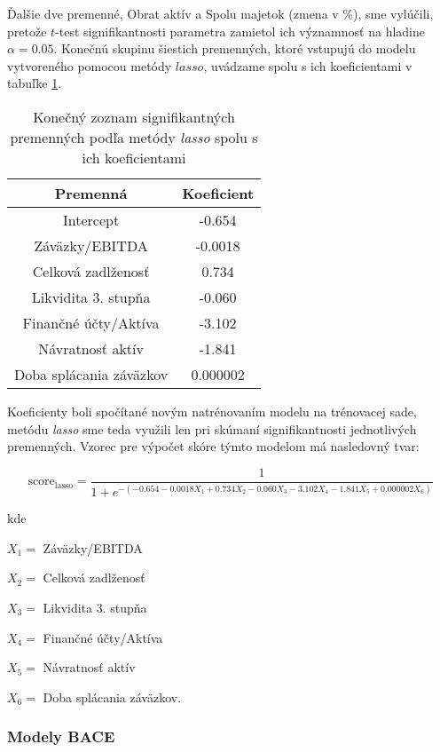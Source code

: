 Ďalšie dve premenné, Obrat aktív a Spolu majetok (zmena v \%), sme vylúčili, pretože \(t\)-test signifikantnosti parametra zamietol ich významnosť na hladine \(\alpha = 0.05\).
Konečnú skupinu šiestich premenných, ktoré vstupujú do modelu vytvoreného pomocou metódy \(lasso\), uvádzame spolu s ich koeficientami v tabuľke \ref{lasso tabulka konecne parametre}.

\begin{table}
    \begin{tabular}{ |c|c| }
        \hline
        Premenná & Koeficient \\
        \hline
        Intercept & -0.654 \\
        \hline
        Záväzky/EBITDA & -0.0018 \\
        \hline
        Celková zadlženosť & 0.734 \\
        \hline
        Likvidita 3. stupňa & -0.060 \\
        \hline
        Finančné účty/Aktíva & -3.102 \\
        \hline
        Návratnosť aktív & -1.841 \\
        \hline
        Doba splácania záväzkov & 0.000002 \\
        \hline
    \end{tabular}
    \caption{Konečný zoznam signifikantných premenných podľa metódy \emph{lasso} spolu s ich koeficientami}
    \label{lasso tabulka konecne parametre}
\end{table}

Koeficienty boli spočítané novým natrénovaním modelu na trénovacej sade,
metódu \emph{lasso} sme teda využili len pri skúmaní signifikantnosti jednotlivých premenných.
Vzorec pre výpočet skóre týmto modelom má nasledovný tvar:

\[
    \text{score}_\text{lasso} = \frac{1}{1 + e^{-(-0.654 - 0.0018X_1 + 0.734X_2 - 0.060X_3 - 3.102X_4 - 1.841X_5 + 0.000002X_6)}}
\]

kde

\(X_1 = \) Záväzky/EBITDA

\(X_2 = \) Celková zadlženosť

\(X_3 = \) Likvidita 3. stupňa

\(X_4 = \) Finančné účty/Aktíva

\(X_5 = \) Návratnosť aktív

\(X_6 = \) Doba splácania záväzkov.

\subsubsection{Modely BACE}
\label{modely bace}

